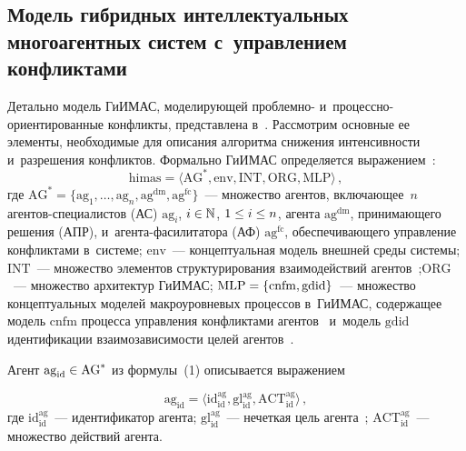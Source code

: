 \begin{multicols}{2}
  \vspace*{-6pt}
  
\section{Модель гибридных интеллектуальных многоагентных 
систем с~управлением конфликтами}

  \vspace*{-2pt}

  Детально модель \mbox{ГиИМАС}, моделирующей проб\-лем\-но-  
и~про\-цес\-сно-ори\-ен\-ти\-ро\-ван\-ные конфликты, представлена в~\cite{4-l}. 
Рассмотрим основные ее элементы, необходимые для описания алгоритма 
снижения ин\-тен\-сив\-ности и~разрешения конфликтов. Формально 
\mbox{ГиИМАС} определяется выражением~\cite{4-l}:
  \begin{equation}
  \mathrm{himas} = \langle \mathrm{AG}^*, \mathrm{env}, \mathrm{INT}, 
\mathrm{ORG}, \mathrm{MLP}\rangle\,,
  \label{e1-l}
  \end{equation}
где $\mathrm{AG}^*=\{ \mathrm{ag}_1, \ldots , \mathrm{ag}_n, \mathrm{ag}^{\mathrm{dm}}, \mathrm{ag}^{\mathrm{fc}}\}$~--- 
множество 
агентов, включающее~$n$ аген\-тов-спе\-ци\-а\-ли\-стов (АС) $\mathrm{ag}_i$, 
$i\hm\in \mathbb{N}$, $1\hm\leq i\hm\leq n$, агента $\mathrm{ag}^{\mathrm{dm}}$, 
при\-ни\-ма\-юще\-го решения (АПР), и~аген\-та-фа\-си\-ли\-та\-то\-ра (АФ) 
$\mathrm{ag}^{\mathrm{fc}}$, обеспечивающего управ\-ле\-ние конфликтами в~сис\-те\-ме; 
$\mathrm{env}$~--- концептуальная модель внешней среды системы; 
$\mathrm{INT}$~--- множество элементов структурирования 
взаимодействий агентов~\cite{4-l};\linebreak $\mathrm{ORG}$~--- множество 
архитектур \mbox{ГиИМАС}; $\mathrm{MLP}\hm= \{\mathrm{cnfm, gdid}\}$~--- 
множество концептуальных моделей \mbox{макроуровневых} процессов 
в~\mbox{ГиИМАС}, содержащее модель $\mathrm{cnfm}$ процесса управ\-ле\-ния 
\mbox{конфликтами} агентов~\cite{15-l} и~модель $\mathrm{gdid}$ идентификации 
взаимозависимости целей агентов~\cite{15-l}. 

  Агент $\mathrm{ag}_{\mathrm{id}}\hm\in \mathrm{AG}^*$ из формулы~(1) описывается 
выражением

\noindent
  $$
  \mathrm{ag_{id}}=\langle \mathrm{id}_{\mathrm{id}}^{\mathrm{ag}}, 
  \mathrm{gl}_{\mathrm{id}}^{\mathrm{ag}}, \mathrm{ACT}_{\mathrm{id}}^{\mathrm{ag}}\rangle\,,
  $$
где $\mathrm{id}_{\mathrm{id}}^{\mathrm{ag}}$~--- идентификатор агента; 
$\mathrm{gl}_{\mathrm{id}}^{\mathrm{ag}}$~--- нечеткая цель 
агента~\cite{15-l}; $\mathrm{ACT}_{\mathrm{id}}^{\mathrm{ag}}$~--- множество действий агента.
  

\end{multicols}
